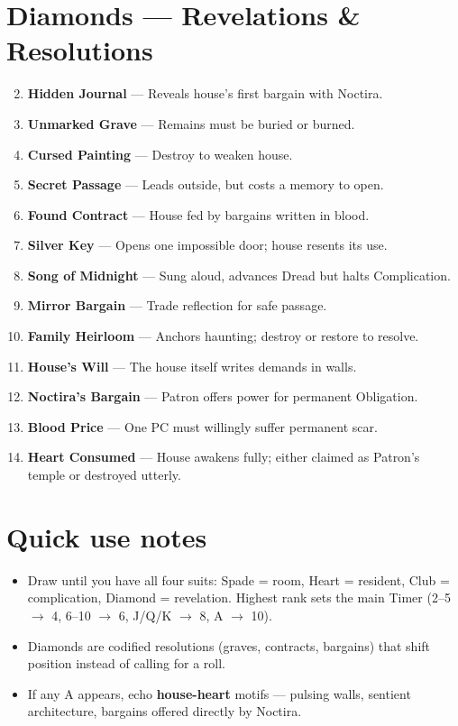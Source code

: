 \documentclass[11pt]{article}
\begin{document}
\section*{Diamonds --- Revelations \& Resolutions}
\label{sec:haunted-house-revelations}
\begin{enumerate}
\setcounter{enumi}{1}
\item \textbf{Hidden Journal} --- Reveals house's first bargain with Noctira.
\item \textbf{Unmarked Grave} --- Remains must be buried or burned.
\item \textbf{Cursed Painting} --- Destroy to weaken house.
\item \textbf{Secret Passage} --- Leads outside, but costs a memory to open.
\item \textbf{Found Contract} --- House fed by bargains written in blood.
\item \textbf{Silver Key} --- Opens one impossible door; house resents its use.
\item \textbf{Song of Midnight} --- Sung aloud, advances Dread but halts Complication.
\item \textbf{Mirror Bargain} --- Trade reflection for safe passage.
\item \textbf{Family Heirloom} --- Anchors haunting; destroy or restore to resolve.
\item[J] \textbf{House's Will} --- The house itself writes demands in walls.
\item[Q] \textbf{Noctira's Bargain} --- Patron offers power for permanent Obligation.
\item[K] \textbf{Blood Price} --- One PC must willingly suffer permanent scar.
\item[A] \textbf{Heart Consumed} --- House awakens fully; either claimed as Patron's temple or destroyed utterly.
\end{enumerate}

\section*{Quick use notes}
\label{sec:haunted-house-quick}
\begin{itemize}
\item Draw until you have all four suits: Spade = room, Heart = resident, Club = complication, Diamond = revelation. Highest rank sets the main Timer (2--5 $\rightarrow$ 4, 6--10 $\rightarrow$ 6, J/Q/K $\rightarrow$ 8, A $\rightarrow$ 10).
\item Diamonds are codified resolutions (graves, contracts, bargains) that shift position instead of calling for a roll.
\item If any A appears, echo \textbf{house-heart} motifs --- pulsing walls, sentient architecture, bargains offered directly by Noctira.
\end{itemize}
\end{document}
